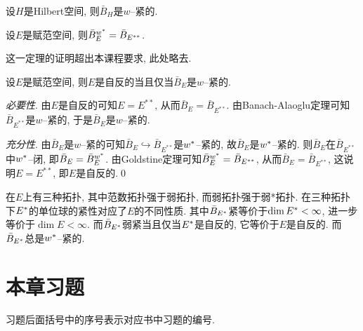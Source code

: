 	\begin{Corollary}
	设$ H $是Hilbert空间, 则$ \bar{B}_H $是$ w $--紧的.
	\end{Corollary}
	
	\begin{Theorem}[Goldstine]
	设$ E $是赋范空间, 则$ \bar{B}_E^{w^{*}}=\bar{B}_{E^{**}} $.
	\end{Theorem}
	
	这一定理的证明超出本课程要求, 此处略去.
	
	\begin{Corollary}[Banach]
	设$ E $是赋范空间, 则$ E $是自反的当且仅当$ \bar{B}_E $是$ w $--紧的.
	\end{Corollary}
	\begin{Proof}
	\textsl{必要性}. 由$ E $是自反的可知$ E=E^{**} $, 从而$ \bar{B}_E=\bar{B}_{E^{**}} $. 由Banach-Alaoglu定理可知$ \bar{B}_{E^{**}} $是$ w $--紧的, 于是$ \bar{B}_E $是$ w $--紧的.
	
	\textsl{充分性}. 由$ \bar{B}_E $是$ w $--紧的可知$ \bar{B}_E\hookrightarrow\bar{B}_{E^{**}} $是$ w^{*} $--紧的, 故$ \bar{B}_E $是$ w^{*} $--紧的. 则$ \bar{B}_E $在$ \bar{B}_{E^{**}} $中$ w^{*} $--闭, 即$ \bar{B}_E=\bar{B}_E^{w^{*}} $. 由Goldstine定理可知$ \bar{B}_E^{w^{*}}=\bar{B}_{E^{**}} $, 从而$ \bar{B}_E=\bar{B}_{E^{**}} $, 这说明$ E=E^{**} $, 即$ E $是自反的.\qed
	\end{Proof}
	
	\begin{Remark}
	在$ E $上有三种拓扑, 其中范数拓扑强于弱拓扑, 而弱拓扑强于弱*拓扑. 在三种拓扑下$ E^{*} $的单位球的紧性对应了$ E $的不同性质. 其中$ \bar{B}_{E^{*}} $紧等价于$ \dim E^{*}<\infty $, 进一步等价于$ \dim E<\infty $. 而$ \bar{B}_{E^{*}} $弱紧当且仅当$ E^{*} $是自反的, 它等价于$ E $是自反的. 而$ \bar{B}_{E^{*}} $总是$ w^{*} $--紧的.
	\end{Remark}
	
\section*{本章习题}
	
	习题后面括号中的序号表示对应书中习题的编号.
	
